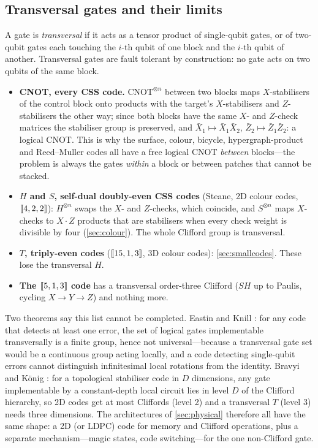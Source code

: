 \subsection{Transversal gates and their limits}\label{sec:transversal}
A gate is \emph{transversal} if it acts as a tensor product of single-qubit gates, or of two-qubit gates each touching the $i$-th qubit of one block and the $i$-th qubit of another. Transversal gates are fault tolerant by construction: no gate acts on two qubits of the same block.
\begin{itemize}[leftmargin=*]
\item \textbf{CNOT, every CSS code.} $\mathrm{CNOT}^{\otimes n}$ between two blocks maps $X$-stabilisers of the control block onto products with the target's $X$-stabilisers and $Z$-stabilisers the other way; since both blocks have the same $X$- and $Z$-check matrices the stabiliser group is preserved, and $\bar X_1\mapsto\bar X_1\bar X_2$, $\bar Z_2\mapsto\bar Z_1\bar Z_2$: a logical CNOT. This is why the surface, colour, bicycle, hypergraph-product and Reed--Muller codes all have a free logical CNOT \emph{between} blocks---the problem is always the gates \emph{within} a block or between patches that cannot be stacked.
\item \textbf{$H$ and $S$, self-dual doubly-even CSS codes} (Steane, 2D colour codes, $[\![4,2,2]\!]$): $H^{\otimes n}$ swaps the $X$- and $Z$-checks, which coincide, and $S^{\otimes n}$ maps $X$-checks to $X\cdot Z$ products that are stabilisers when every check weight is divisible by four (\cref{sec:colour}). The whole Clifford group is transversal.
\item \textbf{$T$, triply-even codes} ($[\![15,1,3]\!]$, 3D colour codes): \cref{sec:smallcodes}. These lose the transversal $H$.
\item \textbf{The $[\![5,1,3]\!]$ code} has a transversal order-three Clifford ($SH$ up to Paulis, cycling $X\to Y\to Z$) and nothing more.
\end{itemize}
Two theorems say this list cannot be completed. Eastin and Knill \cite{eastin-knill09}: for any code that detects at least one error, the set of logical gates implementable transversally is a finite group, hence not universal---because a transversal gate set would be a continuous group acting locally, and a code detecting single-qubit errors cannot distinguish infinitesimal local rotations from the identity. Bravyi and K\"onig \cite{bravyi-koenig13}: for a topological stabiliser code in $D$ dimensions, any gate implementable by a constant-depth local circuit lies in level $D$ of the Clifford hierarchy, so 2D codes get at most Cliffords (level 2) and a transversal $T$ (level 3) needs three dimensions. The architectures of \cref{sec:physical} therefore all have the same shape: a 2D (or LDPC) code for memory and Clifford operations, plus a separate mechanism---magic states, code switching---for the one non-Clifford gate.

